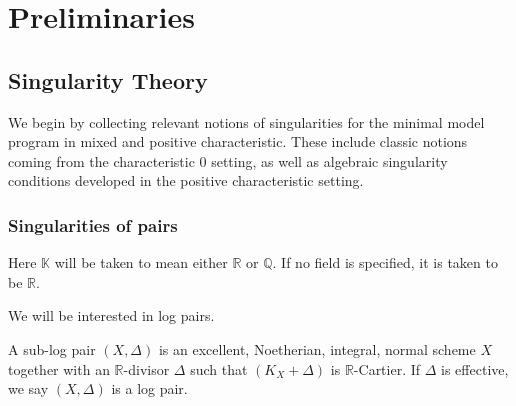 %
%
%
%
\chapter{Preliminaries}
\section{Singularity Theory} \label{Sings}

We begin by collecting relevant notions of singularities for the minimal model program in mixed and positive characteristic. These include classic notions coming from the characteristic $0$ setting, as well as algebraic singularity conditions developed in the positive characteristic setting.

\subsection{Singularities of pairs}
Here $\mathbb{K}$ will be taken to mean either $\mathbb{R}$ or $\mathbb{Q}$. If no field is specified, it is taken to be $\mathbb{R}$.

We will be interested in log pairs. 

\begin{definition}
	
	A sub-log pair $(X,\Delta)$ is an excellent, Noetherian, integral, normal scheme $X$ together with an $\mathbb{R}$-divisor $\Delta$ such that $(K_{X}+\Delta)$ is $\mathbb{R}$-Cartier. If $\Delta$ is effective, we say $(X,\Delta)$ is a log pair.
	
	\end{definition}

